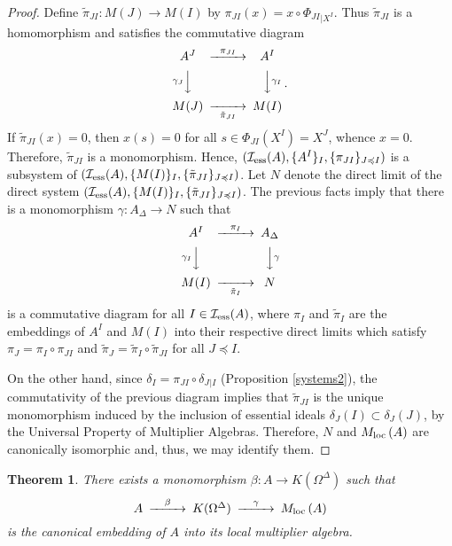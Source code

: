 \documentclass{amsart}
\newtheorem{theorem}{Theorem}[section]
\theoremstyle{definition}
\theoremstyle{remark}
\begin{document}
\begin{proof}
Define $\tilde\pi_{JI}:M(J)\rightarrow M(I)$ by $\pi_{JI}(x)=x\circ\Phi_{JI}{}_{\vert X^I}$. Thus $\tilde\pi_{JI}$ is a homomorphism
and satisfies the commutative diagram
 \begin{equation}\label{compat1}
\begin{CD}
A^J  @>{\pi_{JI}}>> A^I  \\
@V{\gamma_J}VV           @VV{\gamma_I}V  \\
M(J)  @>>{\tilde\pi_{JI}}> M(I)
\end{CD}\,.
\end{equation}
If $\tilde\pi_{JI}(x)=0$, then $x(s)=0$ for all $s\in \Phi_{JI}(X^I)=X^J$, whence $x=0$. Therefore, $\tilde\pi_{JI}$ is a monomorphism. Hence,
$( \mathcal I_{\rm ess}(A), \{A^I\}_{I}, \{\pi_{JI}\}_{J \preccurlyeq I})$ is a subsystem of  $( \mathcal I_{\rm ess}(A), \{M(I)\}_{I}, \{\tilde\pi_{JI}\}_{J \preccurlyeq I})$. Let
$N$ denote the direct limit of the
direct system $( \mathcal I_{\rm ess}(A), \{M(I)\}_{I}, \{\tilde\pi_{JI}\}_{J \preccurlyeq I})$.
The previous facts imply that there is a
monomorphism $\gamma:A_\Delta\rightarrow N$ such that
\[
\begin{CD}
A^I  @>{\pi_{I}}>> A_\Delta \\
@V{\gamma_I}VV           @VV{\gamma}V  \\
M(I)  @>>{\tilde\pi_{I}}> N
\end{CD}
\]
is a commutative diagram for all $I\in \mathcal I_{\rm ess}(A)$, where $\pi_I$ and $\tilde\pi_I$ are the embeddings of $A^I$
and $M(I)$ into their respective direct limits which satisfy $\pi_J=\pi_I\circ\pi_{JI}$ and $\tilde\pi_J=\tilde\pi_I\circ\tilde\pi_{JI}$ for all $J \preccurlyeq I$.

On the other hand, since $\delta_I=\pi_{JI}\circ\delta_J{}_{\vert I}$ (Proposition \ref{systems2}),
the commutativity of the previous diagram implies that $\tilde \pi_{JI}$ is the unique monomorphism induced
by the inclusion of essential ideals $\delta_J(I)\subset \delta_J(J)$, by the Universal Property of Multiplier Algebras. Therefore, $N$
and ${M_{\rm loc}\,}(A)$ are canonically isomorphic and, thus, we may identify them.
\end{proof}

\begin{theorem}\label{a-komega-mloc inclusion}
There exists a monomorphism $\beta:A\rightarrow K(\Omega^\Delta)$ such that
\[
\begin{CD}
A @>\beta >> K(\Omega^\Delta)
@>\gamma>> {M_{\rm loc}\,}(A)
\end{CD}
\]
is the canonical embedding of $A$ into its local multiplier algebra.
\end{theorem}
\end{document}
